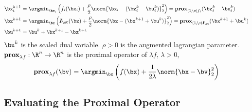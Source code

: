 \documentclass[11pt]{article}
\renewcommand{\sI}{\boldsymbol{I}}
\newcommand{\prox}{\textbf{prox}}
\begin{document}
\begin{align*}
    \bx_i^{k+1} 
        &= \argmin_{\bx_i} \left( f_i(\bx_i) + \frac{\rho}{2} \norm{\bx_i - (\bz_i^k - \bu_i^k)}_2^2 \right) 
        = \prox_{(1/\rho)f_i}(\bz_i^k - \bu_i^k) \\
    \bz^{k+1}
        &= \argmin_{\bz} \left( \sI_{\sC}(\bz) + \frac{\rho}{2} \norm{ \bz - (\bx^{k+1} + \bu^k) }_2^2 \right)
        = \prox_{(1/\rho)\sI_{\sC}}(\bx^{k+1} + \bu^k) \\
    \bu^{k+1} 
        &= \bu^k + \bx^{k+1} - \bz^{k+1}
\end{align*}
$\bu^{k}$ is the scaled dual variable. $\rho>0$ is the augmented lagrangian parameter. $\prox_{\lambda f}: \R^n \to \R^n$ is the proximal operator of $\lambda f$, $\lambda >0$, 
\[
    \prox_{\lambda f}(\bv) = \argmin_{\bx} \left( f(\bx) + \frac{1}{2\lambda} \norm{\bx-\bv}_2^2 \right)    
\]

\subsection{Evaluating the Proximal Operator}
\end{document}
